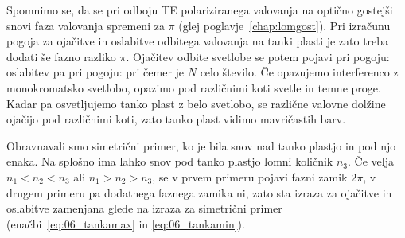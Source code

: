 Spomnimo se, da se pri odboju TE polariziranega valovanja na optično gostejši snovi
faza valovanja spremeni za $\pi$ (glej poglavje~\ref{chap:lomgost}). Pri izračunu pogoja
za ojačitve in oslabitve odbitega valovanja na tanki plasti je zato treba 
dodati še fazno razliko $\pi$. Ojačitev odbite svetlobe se potem pojavi pri pogoju:
oslabitev pa pri pogoju:
pri čemer je $N$ celo število. Če opazujemo interferenco z monokromatsko svetlobo,
opazimo pod različnimi koti svetle in temne proge. Kadar pa osvetljujemo tanko plast
z belo svetlobo, se različne valovne dolžine ojačijo pod različnimi koti, zato tanko
plast vidimo mavričastih barv.
\begin{remark}
Obravnavali smo simetrični primer, ko je bila snov nad tanko plastjo in pod njo enaka.
Na splošno ima lahko snov pod tanko plastjo lomni količnik $n_3$. Če velja
$n_1 < n_2 <n_3$ ali $n_1 > n_2 > n_3$, se v prvem primeru pojavi fazni zamik $2\pi$,
v drugem primeru pa dodatnega faznega zamika ni, zato sta izraza za ojačitve in 
oslabitve zamenjana glede na izraza za simetrični primer (enačbi~\ref{eq:06_tankamax} in 
\ref{eq:06_tankamin}).
\end{remark}
